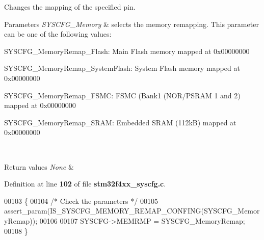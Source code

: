 Changes the mapping of the specified pin. 


\begin{DoxyParams}{Parameters}
{\em S\+Y\+S\+C\+F\+G\+\_\+\+Memory} & selects the memory remapping. This parameter can be one of the following values\+: \begin{DoxyItemize}
\item S\+Y\+S\+C\+F\+G\+\_\+\+Memory\+Remap\+\_\+\+Flash\+: Main Flash memory mapped at 0x00000000 \item S\+Y\+S\+C\+F\+G\+\_\+\+Memory\+Remap\+\_\+\+System\+Flash\+: System Flash memory mapped at 0x00000000 \item S\+Y\+S\+C\+F\+G\+\_\+\+Memory\+Remap\+\_\+\+F\+S\+MC\+: F\+S\+MC (Bank1 (N\+O\+R/\+P\+S\+R\+AM 1 and 2) mapped at 0x00000000 \item S\+Y\+S\+C\+F\+G\+\_\+\+Memory\+Remap\+\_\+\+S\+R\+AM\+: Embedded S\+R\+AM (112kB) mapped at 0x00000000 \end{DoxyItemize}
\\
\hline
\end{DoxyParams}

\begin{DoxyRetVals}{Return values}
{\em None} & \\
\hline
\end{DoxyRetVals}


Definition at line \textbf{ 102} of file \textbf{ stm32f4xx\+\_\+syscfg.\+c}.


\begin{DoxyCode}
00103 \{
00104   \textcolor{comment}{/* Check the parameters */}
00105   assert_param(IS_SYSCFG_MEMORY_REMAP_CONFING(SYSCFG\_MemoryRemap));
00106 
00107   SYSCFG->MEMRMP = SYSCFG\_MemoryRemap;
00108 \}
\end{DoxyCode}
